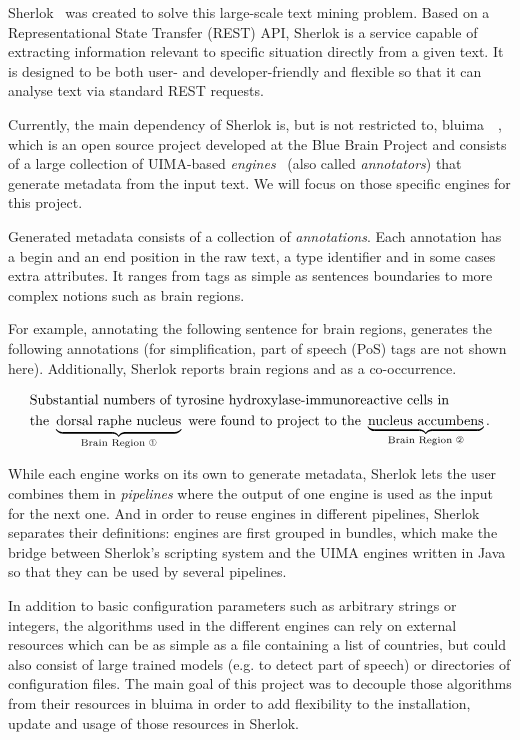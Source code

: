 \documentclass{article}
\newcommand{\ONEWC}{\ding{192}} %
\newcommand{\TWOWC}{\ding{193}} %
\newcommand{\UNDERBRACE}[2]{\underbrace{\text{#1}}_{\mathclap{\text{#2}}}}
\begin{document}
Sherlok~\cite{sherlok} was created to solve this large-scale text mining problem. Based on a
Representational State Transfer (REST) API, Sherlok is a service capable of extracting information
relevant to specific situation directly from a given text. It is designed to be both user- and
developer-friendly and flexible so that it can analyse text via standard REST requests.

Currently, the main dependency of Sherlok is, but is not restricted to,
bluima~\cite{bluima}~\cite{bluima_2013}, which is an open source project developed at the Blue Brain
Project and consists of a large collection of UIMA-based \emph{engines}~\cite{uima} (also called
\emph{annotators}) that generate metadata from the input text.  We will focus on those specific
engines for this project.

Generated metadata consists of a collection of \emph{annotations}. Each annotation has a begin and
an end position in the raw text, a type identifier and in some cases extra attributes. It ranges
from tags as simple as sentences boundaries to more complex notions such as brain regions.

For example, annotating the following sentence for brain regions, generates the following
annotations (for simplification, part of speech (PoS) tags are not shown here). Additionally,
Sherlok reports brain regions \ONEWC\; and \TWOWC\; as a co-occurrence.

\begin{align*}
    & \text{Substantial numbers of tyrosine hydroxylase-immunoreactive cells in}\\
    & \text{the } \UNDERBRACE{dorsal raphe nucleus}{Brain Region \ONEWC}
      \text{ were found to project to the } \UNDERBRACE{nucleus accumbens}{Brain Region \TWOWC}
      \text{.}
\end{align*}

While each engine works on its own to generate metadata, Sherlok lets the user combines them in
\emph{pipelines} where the output of one engine is used as the input for the next one. And in order
to reuse engines in different pipelines, Sherlok separates their definitions: engines are first
grouped in bundles, which make the bridge between Sherlok's scripting system and the UIMA engines
written in Java so that they can be used by several pipelines.

In addition to basic configuration parameters such as arbitrary strings or integers, the algorithms
used in the different engines can rely on external resources which can be as simple as a file
containing a list of countries, but could also consist of large trained models (e.g. to detect part
of speech) or directories of configuration files. The main goal of this project was to decouple
those algorithms from their resources in bluima in order to add flexibility to the installation,
update and usage of those resources in Sherlok.
\end{document}
